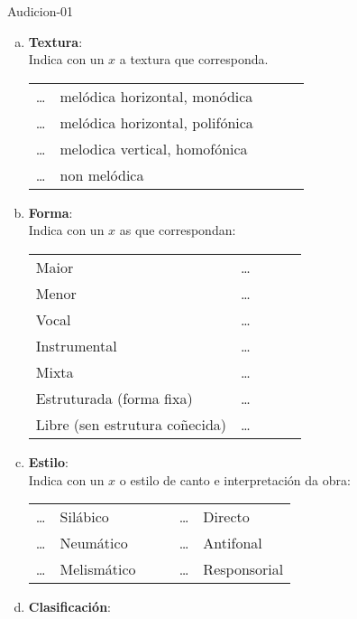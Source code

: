 \begin{defproblem}{Audicion-01}
\begin{ejercicio}[]
\begin{enumerate}[1.-]
\begin{multicols}{2}
\begin{enumerate}[a)]
			\normalsize
		    \item 
		    \textbf{Textura}: \\
		    \small{Indica con un $x$ a textura que corresponda.} \par
			\begin{tabular}{lllll} 
			    \ldots & \small{melódica horizontal, monódica} & & \\
			    \ldots & \small{melódica horizontal, polifónica} & & \\
			    \ldots & \small{melodica vertical, homofónica} & & \\
			    \ldots & \small{non melódica} & & \\
			\end{tabular}
            \normalsize
            \item
			\textbf{Forma}: \\
				\small{Indica con un $x$ as que correspondan:} \par
			\begin{tabular}{lllll} 
			     \small{Maior} & \ldots \\ 
			     \small{Menor} & \ldots \\ 
			     \small{Vocal} & \ldots \\ 
			     \small{Instrumental} & \ldots \\ 
			     \small{Mixta} & \ldots \\ 
			     \small{Estruturada (forma fixa)} & \ldots \\ 
			     \small{Libre (sen estrutura coñecida)} & \ldots \\ 
			\end{tabular}
            \normalsize
		    \item
			\textbf{Estilo}: \\
				\small{Indica con un $x$ o estilo de canto e interpretación da obra:} \par
			\begin{tabular}{llllll}
			     \ldots & \small{Silábico} & & & \ldots & Directo  \\
			     \ldots & \small{Neumático} & & & \ldots & Antifonal   \\
			     \ldots & \small{Melismático} & & & \ldots & Responsorial  \\
			\end{tabular}
            \normalsize
		    \item
			\textbf{Clasificación}: \\

\end{enumerate}
\end{multicols}
\end{enumerate}
\end{ejercicio}
\end{defproblem}
